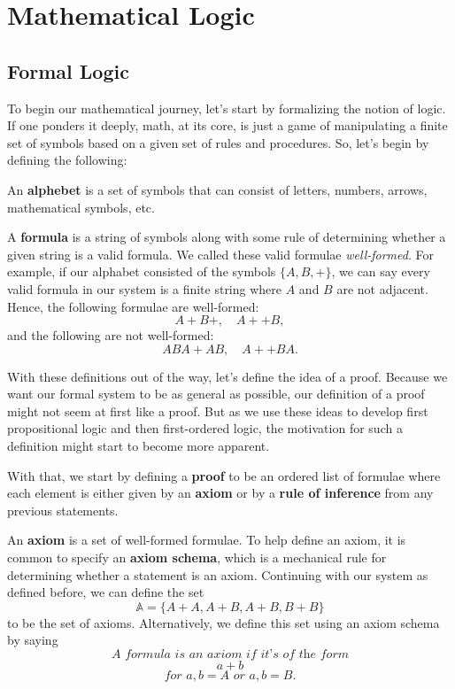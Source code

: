 \edef\mychapter{Mathematical Logic}
\edef\mychapterdate{\date}

\chapter{\mychapter}

\section{Formal Logic}
To begin our mathematical journey, let's start by formalizing the notion of logic.
If one ponders it deeply, math, at its core, is just a game of manipulating a finite set of symbols based on a given set of rules and procedures.
So, let's begin by defining the following:

An \textbf{alphebet} is a set of symbols that can consist of letters, numbers, arrows, mathematical symbols, etc.

A \textbf{formula} is a string of symbols along with some rule of determining whether a given string is a valid formula.
We called these valid formulae \textit{well-formed}.
For example, if our alphabet consisted of the symbols $\{A,B,+\}$, we can say every valid formula in our system is a finite string where $A$ and $B$ are not adjacent.
Hence, the following formulae are well-formed:
$$A+B+, \quad A++B,$$
and the following are not well-formed:
$$ABA+AB, \quad A++BA.$$

With these definitions out of the way, let's define the idea of a proof.
Because we want our formal system to be as general as possible, our definition of a proof might not seem at first like a proof.
But as we use these ideas to develop first propositional logic and then first-ordered logic, the motivation for such a definition might start to become more apparent.

With that, we start by defining a \textbf{proof} to be an ordered list of formulae where each element is either given by an \textbf{axiom} or by a \textbf{rule of inference} from any previous statements.

An \textbf{axiom} is a set of well-formed formulae.
To help define an axiom, it is common to specify an \textbf{axiom schema}, which is a mechanical rule for determining whether a statement is an axiom.
Continuing with our system as defined before, we can define the set
$$\mathbb{A}=\{A+A,A+B, A+B, B+B\}$$
to be the set of axioms.
Alternatively, we define this set using an axiom schema by saying
$$\textit{A formula is an axiom if it's of the form}$$
$$a+b$$
$$\textit{for $a,b=A$ or $a,b=B$}.$$

